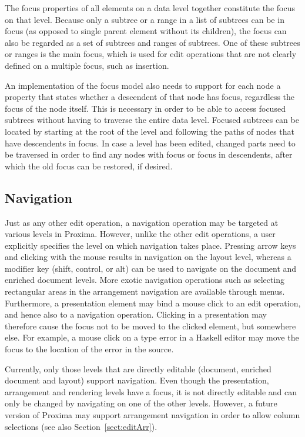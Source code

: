 
The focus properties of all elements on a data level together constitute the focus on that level. Because only a subtree or a range in a list of subtrees can be in focus (as opposed to single parent element without its children), the focus can also be regarded as a set of subtrees and ranges of subtrees. One of these subtrees or ranges is the main focus, which is used for edit operations that are not clearly defined on a multiple focus, such as insertion.

An implementation of the focus model also needs to support for each node a property that states whether a descendent of that node has focus, regardless the focus of the node itself. This is necessary in order to be able to access focused subtrees without having to traverse the entire data level. Focused subtrees can be located by starting at the root of the level and following the paths of nodes that have descendents in focus.  In case a level has been edited, changed parts need to be traversed in order to find any nodes with focus or focus in descendents, after which the old focus can be restored, if desired.


%																
\subsection{Navigation}

Just as any other edit operation, a navigation operation may be targeted at various levels in Proxima. However, unlike the other edit operations, a user explicitly specifies the level on which navigation takes place. Pressing arrow keys and clicking with the mouse results in navigation on the layout level, whereas a modifier key (shift, control, or alt) can be used to navigate on the document and enriched document levels. \bc More exotic navigation operations such as selecting rectangular areas in the arrangement navigation are available through menus. \ec Furthermore, a presentation element may bind a mouse click to an edit operation, and hence also to a navigation operation. Clicking in a presentation may therefore cause the focus not to be moved to the clicked element, but somewhere else. For example, a mouse click on a type error in a Haskell editor may move the focus to the location of the error in the source.

Currently, only those levels that are directly editable (document, enriched document and layout) support navigation. Even though the presentation, arrangement and rendering levels have a focus, it is not directly editable and can only be changed by navigating on one of the other levels. However, a future version of Proxima may support arrangement navigation in order to allow column selections (see also Section~\ref{sect:editArr}).

